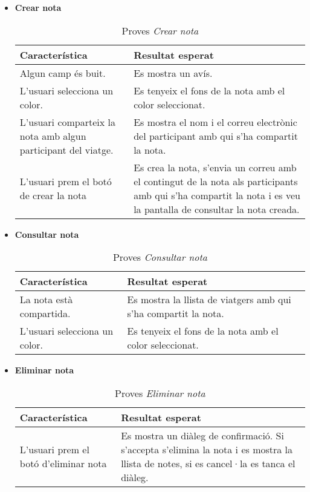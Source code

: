 \begin{itemize}
\item{}\textbf{Crear nota}

\begin{table}[!h]
\centering
\begin{tabular}{|T|T|}
\hline
\textbf{Característica} & \textbf{Resultat esperat} \\\hline
Algun camp és buit. & Es mostra un avís.\\\hline
L'usuari selecciona un color. & Es tenyeix el fons de la nota amb el color seleccionat.\\\hline
L'usuari comparteix la nota amb algun participant del viatge. & Es mostra el nom i el correu electrònic del participant amb qui s'ha compartit la nota.\\\hline
L'usuari prem el botó de crear la nota & Es crea la nota, s'envia un correu amb el contingut de la nota als participants amb qui s'ha compartit la nota i es veu la pantalla de consultar la nota creada.\\\hline
\end{tabular}
\label{}
\caption{Proves \textit{Crear nota}}
\end{table}

\clearpage

\item{}\textbf{Consultar nota}

\begin{table}[!h]
\centering
\begin{tabular}{|T|T|}
\hline
\textbf{Característica} & \textbf{Resultat esperat} \\\hline
La nota està compartida. & Es mostra la llista de viatgers amb qui s'ha compartit la nota.\\\hline
L'usuari selecciona un color. & Es tenyeix el fons de la nota amb el color seleccionat.\\\hline
\end{tabular}
\label{}
\caption{Proves \textit{Consultar nota}}
\end{table}

\item{}\textbf{Eliminar nota}

\begin{table}[!h]
\centering
\begin{tabular}{|T|T|}
\hline
\textbf{Característica} & \textbf{Resultat esperat} \\\hline
L'usuari prem el botó d'eliminar nota & Es mostra un diàleg de confirmació. Si s'accepta s'elimina la nota i es mostra la llista de notes, si es cancel·la es tanca el diàleg.\\\hline
\end{tabular}
\label{}
\caption{Proves \textit{Eliminar nota}}
\end{table}

\end{itemize}

